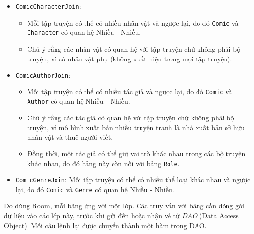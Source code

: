\documentclass[../../../../thesis]{subfiles}
\begin{document}
\begin{itemize}
    \item
        \texttt{ComicCharacterJoin}:

        \begin{itemize}
            \item
                Mỗi tập truyện có thể có nhiều nhân vật và ngược lại, do đó
                \texttt{Comic} và \texttt{Character} có quan hệ Nhiều - Nhiều.
            \item
                Chú ý rằng các nhân vật có quan hệ với tập truyện chứ không phải
                bộ truyện, vì có nhân vật phụ (không xuất hiện trong mọi tập
                truyện).
        \end{itemize}
    \item
        \texttt{ComicAuthorJoin}:

        \begin{itemize}
            \item
                Mỗi tập truyện có thể có nhiều tác giả và ngược lại, do đó
                \texttt{Comic} và \texttt{Author} có quan hệ Nhiều - Nhiều.
            \item
                Chú ý rằng các tác giả có quan hệ với tập truyện chứ không phải
                bộ truyện, vì mô hình xuất bản nhiều truyện tranh là nhà xuất
                bản sở hữu nhân vật và thuê người viết.
            \item
                Đồng thời, một tác giả có thể giữ vai trò khác nhau trong các bộ
                truyện khác nhau, do đó bảng này còn nối với bảng \texttt{Role}.
        \end{itemize}
\end{itemize}

\begin{itemize}[resume, before = \vspace*{-\dimexpr\topsep+\partopsep\relax}]
    \item
        \texttt{ComicGenreJoin}: Mỗi tập truyện có thể có nhiều thể loại khác
        nhau và ngược lại, do đó \texttt{Comic} và \texttt{Genre} có quan hệ
        Nhiều - Nhiều.
\end{itemize}

Do dùng Room, mỗi bảng ứng với một lớp. Các truy vấn với bảng cần đóng gói dữ
liệu vào các lớp này, trước khi gửi đến hoặc nhận về từ \emph{DAO} (Data Access
Object). Mỗi câu lệnh lại được chuyển thành một hàm trong DAO.
\end{document}
